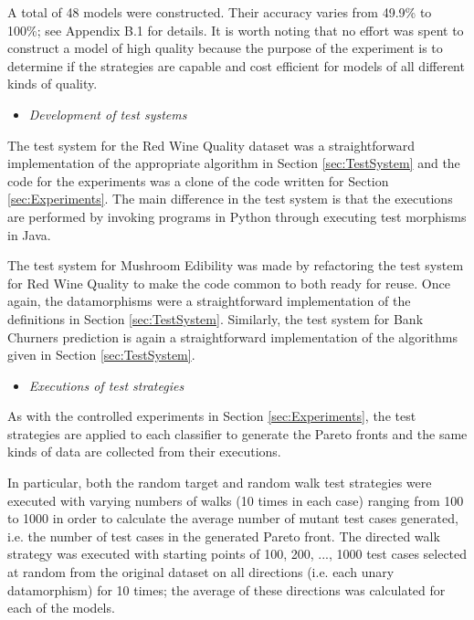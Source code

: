\documentclass[preprint,1p,authoryear,times]{elsarticle}
\begin{document}
A total of 48 models were constructed. Their accuracy varies from 49.9\% to 100\%; see Appendix B.1 for details. It is worth noting that no effort was spent to construct a model of high quality because the purpose of the experiment is to determine if the strategies are capable and cost efficient for models of all different kinds of quality.

\begin{itemize}
\item \emph{Development of test systems}
\end{itemize}

The test system for the Red Wine Quality dataset was a straightforward implementation of the appropriate algorithm in Section \ref{sec:TestSystem} and the code for the experiments was a clone of the code written for Section \ref{sec:Experiments}. The main difference in the test system is that the executions are performed by invoking programs in Python through executing test morphisms in Java.

The test system for Mushroom Edibility was made by refactoring the test system for Red Wine Quality to make the code common to both ready for reuse. Once again, the datamorphisms were a straightforward implementation of the definitions in Section \ref{sec:TestSystem}. Similarly, the test system for Bank Churners prediction is again a straightforward implementation of the algorithms given in Section \ref{sec:TestSystem}. 

\begin{itemize}
\item \emph{Executions of test strategies}
\end{itemize}

As with the controlled experiments in Section \ref{sec:Experiments}, the test strategies are applied to each classifier to generate the Pareto fronts and the same kinds of data are collected from their executions.

In particular, both the random target and random walk test strategies were executed with varying numbers of walks (10 times in each case) ranging from 100 to 1000 in order to calculate the average number of mutant test cases generated, i.e. the number of test cases in the generated Pareto front.  The directed walk strategy was executed with starting points of 100, 200, ..., 1000 test cases selected at random from the original dataset on all directions (i.e. each unary datamorphism) for 10 times; the average of these directions was calculated for each of the models. 
\end{document}

